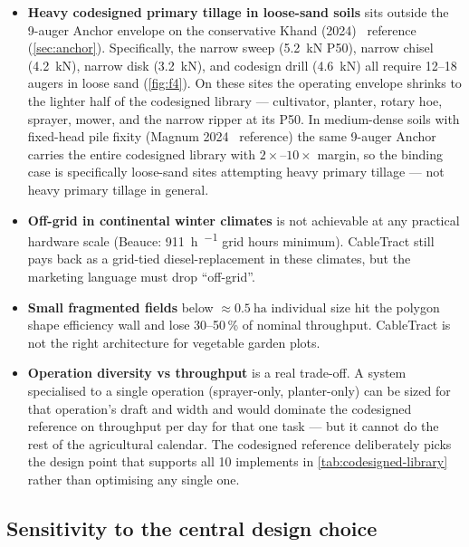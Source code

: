 \documentclass[11pt,a4paper]{article}
\begin{document}
\begin{itemize}[leftmargin=1.6em,itemsep=0.15em]
    \item \textbf{Heavy codesigned primary tillage in loose-sand soils} sits outside the 9-auger Anchor envelope on the conservative Khand (2024)~\cite{khand2024helical} reference (\cref{sec:anchor}). Specifically, the narrow sweep (\SI{5.2}{\kilo\newton} P50), narrow chisel (\SI{4.2}{\kilo\newton}), narrow disk (\SI{3.2}{\kilo\newton}), and codesign drill (\SI{4.6}{\kilo\newton}) all require 12--18 augers in loose sand (\cref{fig:f4}). On these sites the operating envelope shrinks to the lighter half of the codesigned library --- cultivator, planter, rotary hoe, sprayer, mower, and the narrow ripper at its P50. In medium-dense soils with fixed-head pile fixity (Magnum 2024~\cite{magnum2024fixed} reference) the same 9-auger Anchor carries the entire codesigned library with $2\times$--$10\times$ margin, so the binding case is specifically loose-sand sites attempting heavy primary tillage --- not heavy primary tillage in general.
    \item \textbf{Off-grid in continental winter climates} is not achievable at any practical hardware scale (Beauce: \SI{911}{\hour\per\year} grid hours minimum). CableTract still pays back as a grid-tied diesel-replacement in these climates, but the marketing language must drop ``off-grid''.
    \item \textbf{Small fragmented fields} below ${\approx}\SI{0.5}{\hectare}$ individual size hit the polygon shape efficiency wall and lose 30--50\,\% of nominal throughput. CableTract is not the right architecture for vegetable garden plots.
    \item \textbf{Operation diversity vs throughput} is a real trade-off. A system specialised to a single operation (sprayer-only, planter-only) can be sized for that operation's draft and width and would dominate the codesigned reference on throughput per day for that one task --- but it cannot do the rest of the agricultural calendar. The codesigned reference deliberately picks the design point that supports all 10 implements in \cref{tab:codesigned-library} rather than optimising any single one.
\end{itemize}

\subsection{Sensitivity to the central design choice}\label{sec:codesign-sensitivity}
\end{document}
